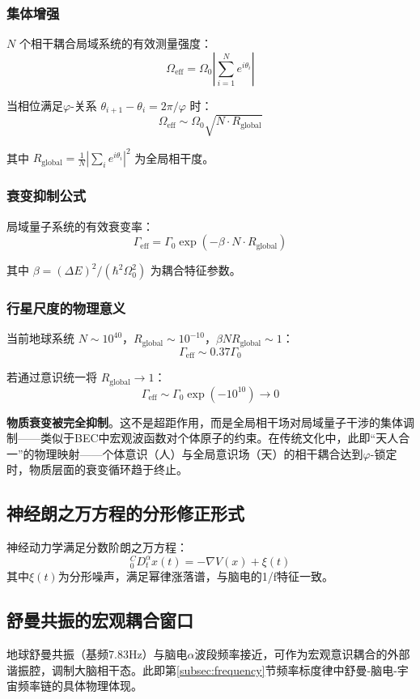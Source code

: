 \documentclass[12pt,a4paper,twocolumn]{article}
\renewcommand{\phi}{\varphi}
\begin{document}
\subsubsection{集体增强}

$N$ 个相干耦合局域系统的有效测量强度：
$$\Omega_{\text{eff}} = \Omega_0 \left|\sum_{i=1}^N e^{i\theta_i}\right|$$

当相位满足$\phi$-关系 $\theta_{i+1}-\theta_i = 2\pi/\phi$ 时：
$$\Omega_{\text{eff}} \sim \Omega_0\sqrt{N\cdot R_{\text{global}}}$$

其中 $R_{\text{global}} = \frac{1}{N}\left|\sum_i e^{i\theta_i}\right|^2$ 为全局相干度。

\subsubsection{衰变抑制公式}

局域量子系统的有效衰变率：
\begin{equation}
\Gamma_{\text{eff}} = \Gamma_0 \exp\left(-\beta \cdot N \cdot R_{\text{global}}\right)
\end{equation}

其中 $\beta = (\Delta E)^2/(\hbar^2\Omega_0^2)$ 为耦合特征参数。

\subsubsection{行星尺度的物理意义}

当前地球系统 $N \sim 10^{40}$，$R_{\text{global}} \sim 10^{-10}$，$\beta N R_{\text{global}} \sim 1$：
$$\Gamma_{\text{eff}} \sim 0.37\Gamma_0$$

若通过意识统一将 $R_{\text{global}} \to 1$：
$$\Gamma_{\text{eff}} \sim \Gamma_0 \exp(-10^{10}) \to 0$$

\textbf{物质衰变被完全抑制}。这不是超距作用，而是全局相干场对局域量子干涉的集体调制——类似于BEC中宏观波函数对个体原子的约束。在传统文化中，此即``天人合一''的物理映射——个体意识（人）与全局意识场（天）的相干耦合达到$\phi$-锁定时，物质层面的衰变循环趋于终止。

\subsection{神经朗之万方程的分形修正形式}
神经动力学满足分数阶朗之万方程：
\[
{}_{0}^{C}D_t^\alpha x(t) = -\nabla V(x) + \xi(t)
\]
其中$\xi(t)$为分形噪声，满足幂律涨落谱，与脑电的1/f特征一致。

\subsection{舒曼共振的宏观耦合窗口}
地球舒曼共振（基频7.83Hz）与脑电$\alpha$波段频率接近，可作为宏观意识耦合的外部谐振腔，调制大脑相干态。此即第\ref{subsec:frequency}节频率标度律中舒曼-脑电-宇宙频率链的具体物理体现。
\end{document}
